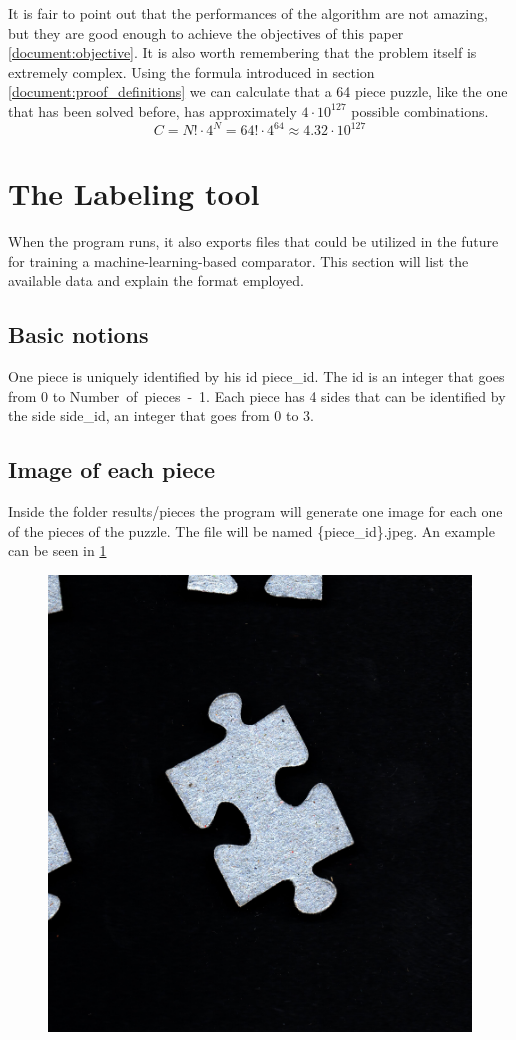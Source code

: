 \documentclass{article}
\begin{document}
It is fair to point out that the performances of the algorithm are not amazing,
but they are good enough to achieve the objectives of this paper \cref{document:objective}.
It is also worth remembering that the problem itself is extremely complex.
Using the formula introduced in section \cref{document:proof_definitions} we can calculate that a 64 piece puzzle,
like the one that has been solved before, has approximately \(4 \cdot 10^{127}\) possible combinations.
\[C = N! \cdot 4^N =  64! \cdot 4^{64} \approx 4.32 \cdot 10^{127}\]


\section{The Labeling tool}
When the program runs, it also exports files that could be utilized
in the future for training a machine-learning-based comparator.
This section will list the available data and explain the format employed.

\subsection{Basic notions}

One piece is uniquely identified by his id piece\_id.
The id is an integer that goes from 0 to \mbox{Number of pieces - 1}.
Each piece has 4 sides that can be identified by the side side\_id,
an integer that goes from 0 to 3.

\subsection{Image of each piece}

Inside the folder results/pieces the program will generate one image
for each one of the pieces of the puzzle. The file will be named \{piece\_id\}.jpeg.
An example can be seen in \cref{fig:result_pieces}

\begin{figure}[H]
  \caption{}\label{fig:result_pieces}
  \centering
  \includegraphics[height=0.3\textwidth]{pictures/result_pieces.jpeg}
\end{figure}
\end{document}

